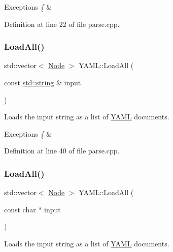 \begin{DoxyExceptions}{Exceptions}
{\em \{} & \\
\hline
\end{DoxyExceptions}


Definition at line 22 of file parse.\+cpp.

\mbox{\label{namespace_y_a_m_l_ad8c237adfc2e6f077cef893d9e9f7f9d}} 
\subsubsection{\texorpdfstring{LoadAll()}{LoadAll()}\hspace{0.1cm}{\footnotesize\ttfamily [1/3]}}
{\footnotesize\ttfamily std\+::vector$<$ \mbox{\hyperlink{class_y_a_m_l_1_1_node}{Node}} $>$ Y\+A\+M\+L\+::\+Load\+All (\begin{DoxyParamCaption}\item[{const \mbox{\hyperlink{glad_8h_ac83513893df92266f79a515488701770}{std\+::string}} \&}]{input }\end{DoxyParamCaption})}

Loads the input string as a list of \mbox{\hyperlink{namespace_y_a_m_l}{Y\+A\+ML}} documents.


\begin{DoxyExceptions}{Exceptions}
{\em \{} & \\
\hline
\end{DoxyExceptions}


Definition at line 40 of file parse.\+cpp.

\mbox{\label{namespace_y_a_m_l_aa84968ed9609c1df427baffc554a27ec}} 
\subsubsection{\texorpdfstring{LoadAll()}{LoadAll()}\hspace{0.1cm}{\footnotesize\ttfamily [2/3]}}
{\footnotesize\ttfamily std\+::vector$<$ \mbox{\hyperlink{class_y_a_m_l_1_1_node}{Node}} $>$ Y\+A\+M\+L\+::\+Load\+All (\begin{DoxyParamCaption}\item[{const char $\ast$}]{input }\end{DoxyParamCaption})}

Loads the input string as a list of \mbox{\hyperlink{namespace_y_a_m_l}{Y\+A\+ML}} documents.


